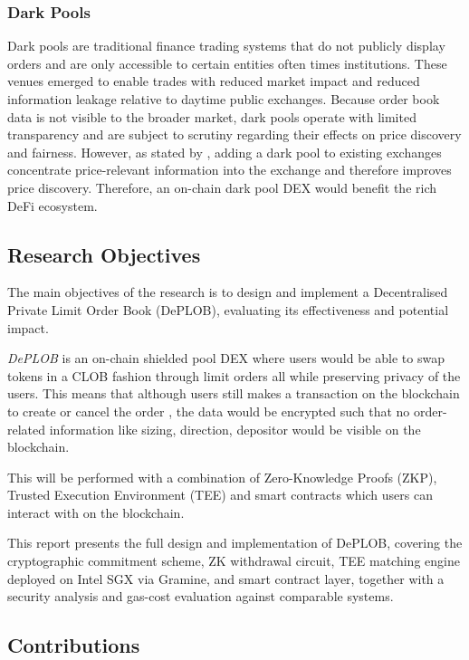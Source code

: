 \documentclass[12pt,a4paper]{article}
\begin{document}
\subsubsection{Dark Pools}
Dark pools are traditional finance trading systems that do not publicly display orders and are only accessible to certain entities often times institutions. These venues emerged to enable trades with reduced market impact and reduced information leakage relative to daytime public exchanges. Because order book data is not visible to the broader market, dark pools operate with limited transparency and are subject to scrutiny regarding their effects on price discovery and fairness. However, as stated by \textcite{zhu2014dark}, adding a dark pool to existing exchanges concentrate price-relevant information into the exchange and therefore improves price discovery. Therefore, an on-chain dark pool DEX would benefit the rich DeFi ecosystem. 

\subsection{Research Objectives}
The main objectives of the research is to design and implement a Decentralised Private Limit Order Book (DePLOB), evaluating its effectiveness and potential impact.

\textit{DePLOB} is an on-chain shielded pool DEX where users would be able to swap tokens in a CLOB fashion through limit orders all while preserving privacy of the users. This means that although users still makes a transaction on the blockchain to create or cancel the order , the data would be encrypted such that no order-related information like sizing, direction, depositor would be visible on the blockchain. 

This will be performed with a combination of Zero-Knowledge Proofs (ZKP), Trusted Execution Environment (TEE) and smart contracts which users can interact with on the blockchain.

This report presents the full design and implementation of DePLOB, covering the cryptographic commitment scheme, ZK withdrawal circuit, TEE matching engine deployed on Intel SGX via Gramine, and smart contract layer, together with a security analysis and gas-cost evaluation against comparable systems.

\subsection{Contributions}
\end{document}
